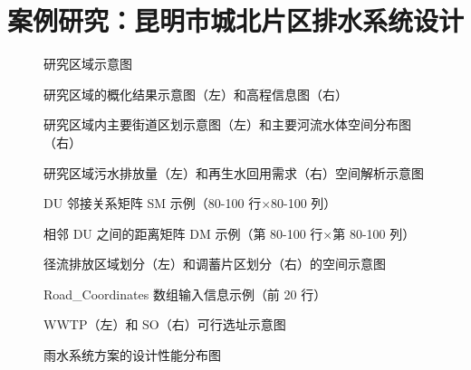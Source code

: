 \documentclass[degree=doctor]{thuthesis}
\begin{document}
\chapter{案例研究：昆明市城北片区排水系统设计}

\clearpage
\setcounter{page}{109}
\begin{figure}
  \centering
  \caption{研究区域示意图}
\end{figure}

\clearpage
\setcounter{page}{111}
\begin{figure}
  \centering
  \caption{研究区域的概化结果示意图（左）和高程信息图（右）}
\end{figure}

\clearpage
\setcounter{page}{113}
\begin{figure}
  \centering
  \caption{研究区域内主要街道区划示意图（左）和主要河流水体空间分布图（右）}
\end{figure}

\clearpage
\setcounter{page}{116}
\begin{figure}
  \centering
  \caption{研究区域污水排放量（左）和再生水回用需求（右）空间解析示意图}
\end{figure}

\begin{figure}
  \centering
  \caption{DU 邻接关系矩阵 SM 示例（80-100 行×80-100 列）}
\end{figure}

\clearpage
\setcounter{page}{117}
\begin{figure}
  \centering
  \caption{相邻 DU 之间的距离矩阵 DM 示例（第 80-100 行×第 80-100 列）}
\end{figure}

\begin{figure}
  \centering
  \caption{径流排放区域划分（左）和调蓄片区划分（右）的空间示意图}
\end{figure}

\clearpage
\setcounter{page}{118}
\begin{figure}
  \centering
  \caption{Road\_Coordinates 数组输入信息示例（前 20 行）}
\end{figure}

\begin{figure}
  \centering
  \caption{WWTP（左）和 SO（右）可行选址示意图}
\end{figure}

\clearpage
\setcounter{page}{121}
\begin{figure}
  \centering
  \caption{雨水系统方案的设计性能分布图}
\end{figure}
\end{document}
